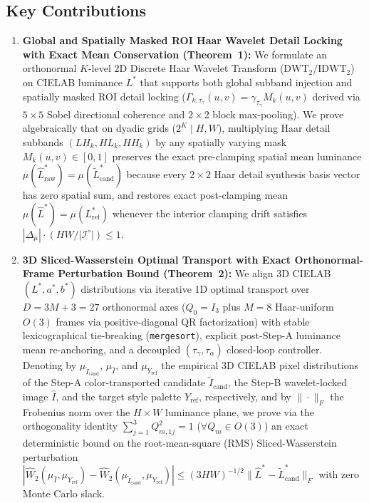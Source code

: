 \documentclass[conference,10pt]{IEEEtran}
\begin{document}
\subsection{Key Contributions}
\begin{enumerate}
    \item \textbf{Global and Spatially Masked ROI Haar Wavelet Detail Locking with Exact Mean Conservation (Theorem~1):} We formulate an orthonormal $K$-level 2D Discrete Haar Wavelet Transform ($\mathrm{DWT}_2/\mathrm{IDWT}_2$)~\cite{haar1910,mallat1989,daubechies1992} on CIELAB luminance $L^*$ that supports both global subband injection and spatially masked ROI detail locking ($\Gamma_{k,\tau_\gamma}(u,v) = \gamma_{\tau_\gamma} M_k(u,v)$ derived via $5\times 5$ Sobel directional coherence and $2\times 2$ block max-pooling). We prove algebraically that on dyadic grids ($2^K \mid H, W$), multiplying Haar detail subbands $(LH_k, HL_k, HH_k)$ by any spatially varying mask $M_k(u,v) \in [0,1]$ preserves the exact pre-clamping spatial mean luminance $\mu(\widehat{L}^*_{\text{raw}}) = \mu(\widetilde{L}^*_{\text{cand}})$ because every $2\times 2$ Haar detail synthesis basis vector has zero spatial sum, and restores exact post-clamping mean $\mu(\widehat{L}^*) = \mu(L^*_{\text{ref}})$ whenever the interior clamping drift satisfies $|\Delta_\mu| \cdot (HW/|\mathcal{I}^\circ|) \le 1$.
    \item \textbf{3D Sliced-Wasserstein Optimal Transport with Exact Orthonormal-Frame Perturbation Bound (Theorem~2):} We align 3D CIELAB $(L^*, a^*, b^*)$ distributions via iterative 1D optimal transport over $D = 3M+3 = 27$ orthonormal axes ($Q_0 = I_3$ plus $M=8$ Haar-uniform $O(3)$ frames via positive-diagonal QR factorization) with stable lexicographical tie-breaking (\texttt{mergesort}), explicit post-Step-A luminance mean re-anchoring, and a decoupled $(\tau_\gamma, \tau_\alpha)$ closed-loop controller. Denoting by $\mu_{\widetilde{I}_{\text{cand}}}$, $\mu_{\widehat{I}}$, and $\mu_{Y_{\text{ref}}}$ the empirical 3D CIELAB pixel distributions of the Step-A color-transported candidate $\widetilde{I}_{\text{cand}}$, the Step-B wavelet-locked image $\widehat{I}$, and the target style palette $Y_{\text{ref}}$, respectively, and by $\|\cdot\|_F$ the Frobenius norm over the $H\times W$ luminance plane, we prove via the orthogonality identity $\sum_{j=1}^3 Q_{m,1j}^2 = 1$ ($\forall Q_m \in O(3)$) an exact deterministic bound on the root-mean-square (RMS) Sliced-Wasserstein perturbation $|\widehat{W}_2(\mu_{\widehat{I}}, \mu_{Y_{\text{ref}}}) - \widehat{W}_2(\mu_{\widetilde{I}_{\text{cand}}}, \mu_{Y_{\text{ref}}})| \le (3HW)^{-1/2} \|\widehat{L}^* - \widetilde{L}^*_{\text{cand}}\|_F$ with zero Monte Carlo slack.

\end{enumerate}
\end{document}
